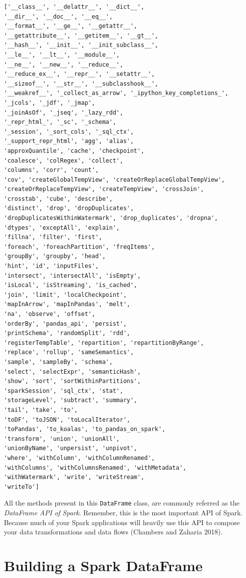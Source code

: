 \documentclass[
  11pt,
  letterpaper,
  DIV=11,
  numbers=noendperiod]{scrreprt}
\begin{document}
\begin{verbatim}
['__class__', '__delattr__', '__dict__',
'__dir__', '__doc__', '__eq__',
'__format__', '__ge__', '__getattr__',
'__getattribute__', '__getitem__', '__gt__',
'__hash__', '__init__', '__init_subclass__',
'__le__', '__lt__', '__module__',
'__ne__', '__new__', '__reduce__',
'__reduce_ex__', '__repr__', '__setattr__',
'__sizeof__', '__str__', '__subclasshook__',
'__weakref__', '_collect_as_arrow', '_ipython_key_completions_',
'_jcols', '_jdf', '_jmap',
'_joinAsOf', '_jseq', '_lazy_rdd',
'_repr_html_', '_sc', '_schema',
'_session', '_sort_cols', '_sql_ctx',
'_support_repr_html', 'agg', 'alias',
'approxQuantile', 'cache', 'checkpoint',
'coalesce', 'colRegex', 'collect',
'columns', 'corr', 'count',
'cov', 'createGlobalTempView', 'createOrReplaceGlobalTempView',
'createOrReplaceTempView', 'createTempView', 'crossJoin',
'crosstab', 'cube', 'describe',
'distinct', 'drop', 'dropDuplicates',
'dropDuplicatesWithinWatermark', 'drop_duplicates', 'dropna',
'dtypes', 'exceptAll', 'explain',
'fillna', 'filter', 'first',
'foreach', 'foreachPartition', 'freqItems',
'groupBy', 'groupby', 'head',
'hint', 'id', 'inputFiles',
'intersect', 'intersectAll', 'isEmpty',
'isLocal', 'isStreaming', 'is_cached',
'join', 'limit', 'localCheckpoint',
'mapInArrow', 'mapInPandas', 'melt',
'na', 'observe', 'offset',
'orderBy', 'pandas_api', 'persist',
'printSchema', 'randomSplit', 'rdd',
'registerTempTable', 'repartition', 'repartitionByRange',
'replace', 'rollup', 'sameSemantics',
'sample', 'sampleBy', 'schema',
'select', 'selectExpr', 'semanticHash',
'show', 'sort', 'sortWithinPartitions',
'sparkSession', 'sql_ctx', 'stat',
'storageLevel', 'subtract', 'summary',
'tail', 'take', 'to',
'toDF', 'toJSON', 'toLocalIterator',
'toPandas', 'to_koalas', 'to_pandas_on_spark',
'transform', 'union', 'unionAll',
'unionByName', 'unpersist', 'unpivot',
'where', 'withColumn', 'withColumnRenamed',
'withColumns', 'withColumnsRenamed', 'withMetadata',
'withWatermark', 'write', 'writeStream',
'writeTo']
\end{verbatim}

All the methods present in this \texttt{DataFrame} class, are commonly
referred as the \emph{DataFrame API of Spark}. Remember, this is the
most important API of Spark. Because much of your Spark applications
will heavily use this API to compose your data transformations and data
flows (Chambers and Zaharia 2018).

\hypertarget{sec-building-a-dataframe}{%
\section{Building a Spark DataFrame}\label{sec-building-a-dataframe}}
\end{document}
